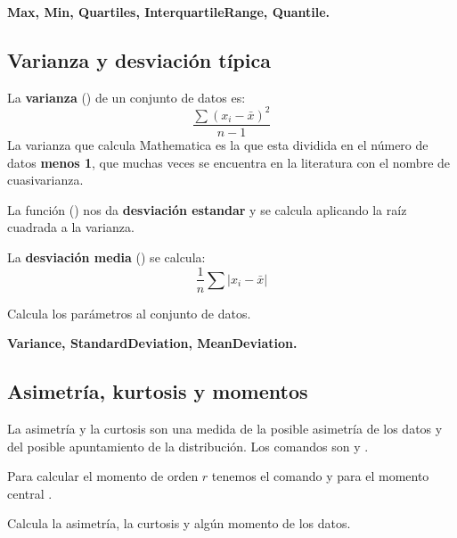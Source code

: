 \documentclass[a4paper,10pt, draft]{article}
\newcommand{\com}[1]{\textbf{\color{blue}{#1}}}
\newenvironment{ejer}{\begin{tcolorbox}[center title, title=Ejercicios,
fonttitle=\sffamily\bfseries,colback=blue!5,colframe=orange]}{\end{tcolorbox}}
\newenvironment{funciones}{\begin{tcolorbox}[center title, title=Nuevas funciones, fonttitle=\sffamily\bfseries, colback=green!5!white,colframe=red!75!black]}{\end{tcolorbox}\bigskip}
\begin{document}
\begin{funciones}

\textbf{Max, Min, Quartiles, InterquartileRange, Quantile.}



\end{funciones}

 \newpage

\subsection{Varianza y desviación típica}

La \textbf{varianza} (\com{Variance[v]})  de un conjunto de datos es:
$$
\frac{\sum(x_i - \bar x)^2}{n-1}
$$
La varianza que calcula Mathematica es la que esta dividida en el número de datos \textbf{menos 1}, que muchas veces se encuentra en la literatura con el nombre de cuasivarianza.

La función (\com{StandardDeviation[v]}) nos da \textbf{desviación estandar} y se calcula aplicando la  raíz cuadrada a la varianza.

La \textbf{desviación media} (\com{MeanDeviation[v]}) se calcula:
$$
\frac{1}{n}\sum |x_i-\bar x|
$$

\begin{ejer}

Calcula los parámetros al conjunto de datos.


\end{ejer} 


\begin{funciones}

\textbf{Variance, StandardDeviation, MeanDeviation.}

\end{funciones}

 \newpage

\subsection{Asimetría, kurtosis y momentos}

La asimetría y la curtosis son una medida de la posible asimetría de los datos y del posible apuntamiento de la distribución. Los comandos son \com{Skewness[v]} y \com{Kurtosis[v]}.

Para calcular el momento de orden $r$ tenemos el comando \com{Moment[v,r]} y para el momento central \com{CentralMoment[v,r]}.

\begin{ejer}

Calcula la asimetría,  la curtosis y algún momento de los datos.

\end{ejer}  
\end{document}
